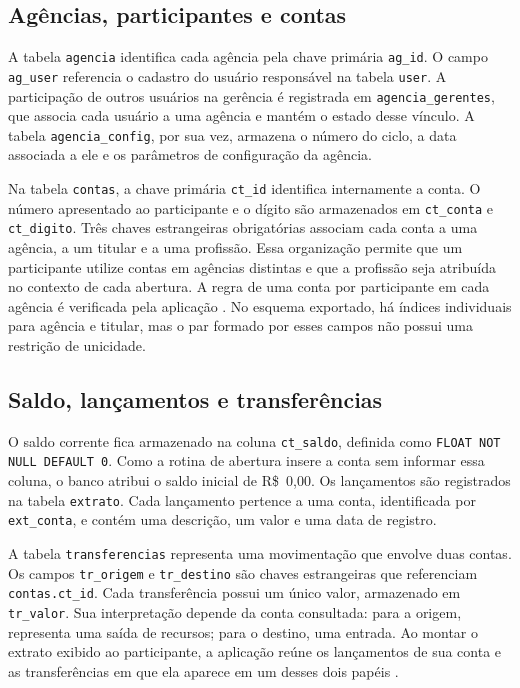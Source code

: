 \subsection{Agências, participantes e contas}

A tabela \texttt{agencia} identifica cada agência pela chave primária
\texttt{ag\_id}. O campo \texttt{ag\_user} referencia o cadastro do
usuário responsável na tabela \texttt{user}. A participação de outros
usuários na gerência é registrada em \texttt{agencia\_gerentes},
que associa cada usuário a uma agência e mantém o estado desse
vínculo. A tabela \texttt{agencia\_config}, por sua vez, armazena o
número do ciclo, a data associada a ele e os parâmetros de
configuração da agência.

Na tabela \texttt{contas}, a chave primária \texttt{ct\_id}
identifica internamente a conta. O número apresentado ao
participante e o dígito são armazenados em \texttt{ct\_conta} e
\texttt{ct\_digito}. Três chaves estrangeiras obrigatórias associam
cada conta a uma agência, a um titular e a uma profissão.
Essa organização permite que um participante utilize contas em
agências distintas e que a profissão seja atribuída no contexto de
cada abertura. A regra de uma conta por participante em cada
agência é verificada pela aplicação \cite{bravin2026edbank}.
No esquema exportado, há índices individuais para agência e
titular, mas o par formado por esses campos não possui uma
restrição de unicidade.

\subsection{Saldo, lançamentos e transferências}

O saldo corrente fica armazenado na coluna \texttt{ct\_saldo},
definida como \texttt{FLOAT NOT NULL DEFAULT 0}. Como a rotina de
abertura insere a conta sem informar essa coluna, o banco atribui
o saldo inicial de \mbox{R\$~0,00}. Os lançamentos são registrados
na tabela \texttt{extrato}. Cada lançamento pertence a uma conta,
identificada por \texttt{ext\_conta}, e contém uma descrição,
um valor e uma data de registro.

A tabela \texttt{transferencias} representa uma movimentação que
envolve duas contas. Os campos \texttt{tr\_origem} e
\texttt{tr\_destino} são chaves estrangeiras que referenciam
\texttt{contas.ct\_id}. Cada transferência possui um único valor,
armazenado em \texttt{tr\_valor}. Sua interpretação depende da
conta consultada: para a origem, representa uma saída de recursos;
para o destino, uma entrada. Ao montar o extrato exibido ao
participante, a aplicação reúne os lançamentos de sua conta e as
transferências em que ela aparece em um desses dois papéis
\cite{bravin2026edbank}.


